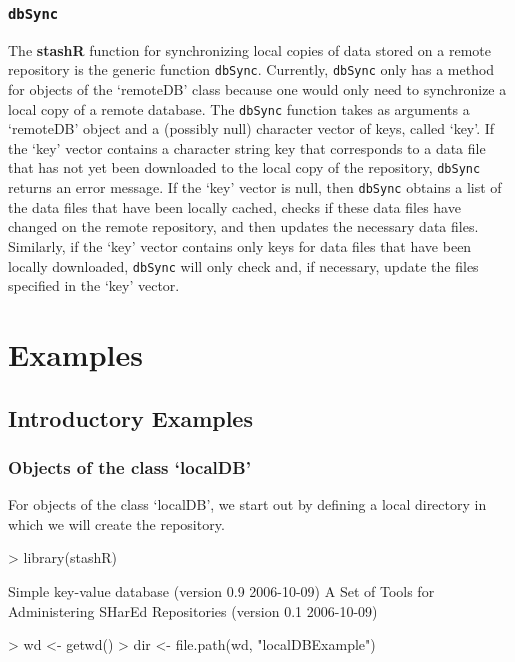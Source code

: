 \documentclass{article}
\newcommand{\pkg}{\textbf}
\newcommand{\code}{\texttt}
\begin{document}
\subsubsection{\code{dbSync}}\label{synch-interface}
The \pkg{stashR} function for synchronizing local copies
of data stored on a remote repository is the generic function
\code{dbSync}. Currently, \code{dbSync} only has a method for
objects of the `remoteDB' class because one would only need
to synchronize a local copy of a remote database. The
\code{dbSync} function takes as arguments a `remoteDB'
object and a (possibly null) character vector of keys, called
`key'. If the `key' vector contains a character string key that
corresponds to a data file that has not yet been downloaded to the
local copy of the repository, \code{dbSync} returns an error
message. If the `key' vector is null, then \code{dbSync} obtains a
list of the data files that have been locally cached, checks if
these data files have changed on the remote repository, and then
updates the necessary data files. Similarly, if the `key' vector
contains only keys for data files that have been locally
downloaded, \code{dbSync} will only check and, if necessary,
update the files specified in the `key' vector.


\section{Examples}

\subsection{Introductory Examples}

\subsubsection{Objects of the class `localDB'} 

For objects of the class `localDB', we start out by 
defining a local directory in which we will create the 
repository.

\begin{Schunk}
\begin{Sinput}
> library(stashR)
\end{Sinput}
\begin{Soutput}
Simple key-value database (version 0.9 2006-10-09)
A Set of Tools for Administering SHarEd Repositories (version 0.1
2006-10-09)
\end{Soutput}
\begin{Sinput}
> wd <- getwd()
> dir <- file.path(wd, "localDBExample")
\end{Sinput}
\end{Schunk}
\end{document}
